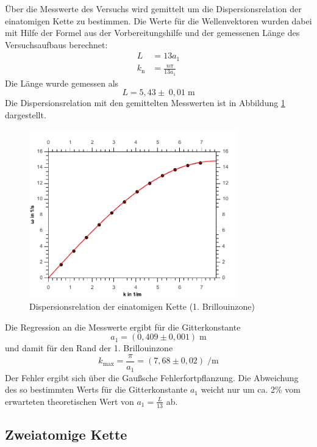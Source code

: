 Über die Messwerte des Versuchs wird gemittelt um die Dispersionsrelation der einatomigen Kette zu bestimmen. Die Werte für die Wellenvektoren wurden dabei mit Hilfe der Formel aus der Vorbereitungshilfe und der gemessenen Länge des Versuchsaufbaus berechnet:
\begin{align}
	L &= 13a_1\\
	k_{\textrm{n}} &= \frac{n\pi}{13a_1}
\end{align}
Die Länge wurde gemessen als
\begin{equation}
	L = 5,43 \pm\; 0,01\;\si{\meter}
\end{equation}
Die Dispersionsrelation mit den gemittelten Messwerten ist in Abbildung \ref{fig:a1_one} dargestellt.
\begin{figure}[h]
	\centering\includegraphics[width=0.8\textwidth]{fig/a1_one}
	\caption{Dispersionsrelation der einatomigen Kette (1. Brillouinzone)}
	\label{fig:a1_one}
\end{figure}
Die Regression an die Messwerte ergibt für die Gitterkonstante
\begin{equation}
	a_1 = (0,409 \pm 0,001)\;\si{\meter}
\end{equation}
und damit für den Rand der 1. Brillouinzone
\begin{equation}
	k_{\textrm{max}} = \frac{\pi}{a_1} = (7,68 \pm 0,02)\;\si{\per\meter}
\end{equation}
Der Fehler ergibt sich über die Gaußsche Fehlerfortpflanzung.
Die Abweichung des so bestimmten Werts für die Gitterkonstante $a_1$ weicht nur um ca. 2\;\% vom erwarteten theoretischen Wert von $a_1 = \frac{L}{13}$ ab.

\subsection{Zweiatomige Kette}


